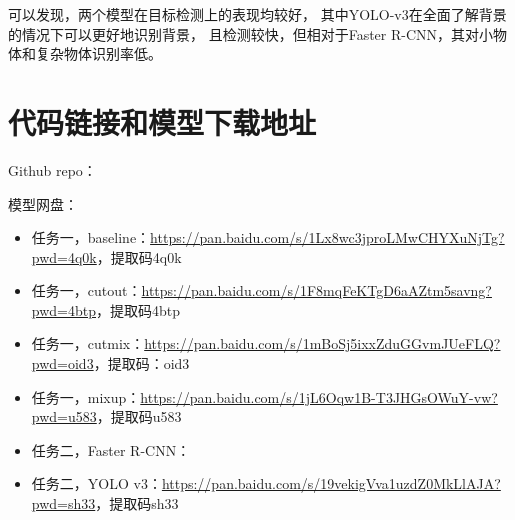 \documentclass[UTF8]{ctexart}
\begin{document}
可以发现，两个模型在目标检测上的表现均较好，
其中YOLO-v3在全面了解背景的情况下可以更好地识别背景，
且检测较快，但相对于Faster R-CNN，其对小物体和复杂物体识别率低。

\section{代码链接和模型下载地址}

Github repo：


模型网盘：

\begin{itemize}
    \item 任务一，baseline：\url{https://pan.baidu.com/s/1Lx8wc3jproLMwCHYXuNjTg?pwd=4q0k}，提取码4q0k
    \item 任务一，cutout：\url{https://pan.baidu.com/s/1F8mqFeKTgD6aAZtm5savng?pwd=4btp}，提取码4btp
    \item 任务一，cutmix：\url{https://pan.baidu.com/s/1mBoSj5ixxZduGGvmJUeFLQ?pwd=oid3}，提取码：oid3
    \item 任务一，mixup：\url{https://pan.baidu.com/s/1jL6Oqw1B-T3JHGsOWuY-vw?pwd=u583}，提取码u583
    \item 任务二，Faster R-CNN：
    \item 任务二，YOLO v3：\url{https://pan.baidu.com/s/19vekigVva1uzdZ0MkLlAJA?pwd=sh33}，提取码sh33
\end{itemize}
\end{document}
